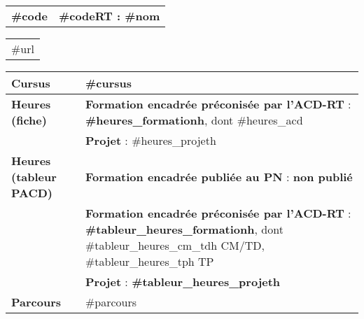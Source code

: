 
 \label{subsubsec:#codelatex}


\setlength{\tabcolsep}{0.125cm} %
\setlength{\extrarowheight}{2pt} %


\begin{tabular}[t]{|P|T|}
\hline %
	 \textcolor{compCAp!20!white}{\bfseries \hypertarget{#codelatex}{#code}}
    &  \textcolor{compCAp!20!white}{\bfseries #codeRT : #nom}
\\
\end{tabular}


\begin{tabular}[t]{|G|}
\hline %
	#url
\\
\end{tabular}

\begin{tabular}[t]{|P|T|}
\hline %
	\textcolor{saeC}{\bfseries Cursus}
	& #cursus  \\
\hline %
\hline
    \textcolor{saeC}{\bfseries Heures (fiche)}
    &
    \textcolor{saeC}{\bfseries Formation encadrée préconisée par l'ACD-RT} : {\bfseries {#heures_formation}h}, dont {#heures_acd} \\
	& \textcolor{saeC}{\bfseries Projet} : {#heures_projet}h \\
\hline
\hline
    \textcolor{saeC}{\bfseries Heures (tableur PACD)}
    &
    \textcolor{saeC}{\bfseries Formation encadrée publiée au PN} : {\bfseries non publié}
    \\ %
    &
    \textcolor{saeC}{\bfseries Formation encadrée préconisée par l'ACD-RT} : {\bfseries {#tableur_heures_formation}h}, dont {#tableur_heures_cm_td}h CM/TD, {#tableur_heures_tp}h TP \\
    &
    \textcolor{saeC}{\bfseries Projet} : {\bfseries {#tableur_heures_projet}h} \\
\hline

\hline %
	\textcolor{saeC}{\bfseries Parcours}
	& #parcours \\
\hline
\end{tabular}

